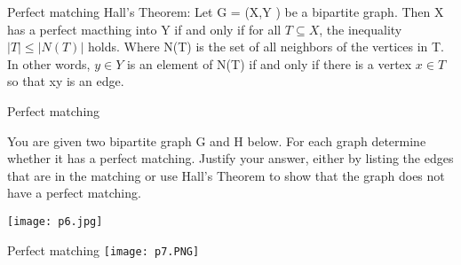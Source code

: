 \documentclass{beamer}
\theoremstyle{definition}
\begin{document}
\begin{frame}{Perfect matching}
 Hall’s Theorem: Let G = (X,Y ) be a bipartite graph. Then X has a perfect macthing into Y if and only if for all $T \subseteq X$, the inequality $|T| \leq |N(T)|$ holds. Where N(T) is the set of all neighbors of the vertices in T. In other words, $y \in  Y$ is an element of N(T) if and only if there is a vertex $x \in  T$ so that xy is an edge.
\end{frame}

\begin{frame}{Perfect matching}
    \begin{flushleft}
        You are given two bipartite graph G and H below. For each graph determine whether it has a perfect matching. Justify your answer, either by listing the edges that are in the matching or use Hall's Theorem to show that the graph does not have a perfect matching.
    \end{flushleft}
    \centering \texttt{[image: p6.jpg]}
\end{frame}

\begin{frame}{Perfect matching}
    \centering \texttt{[image: p7.PNG]}
\end{frame}
\end{document}
